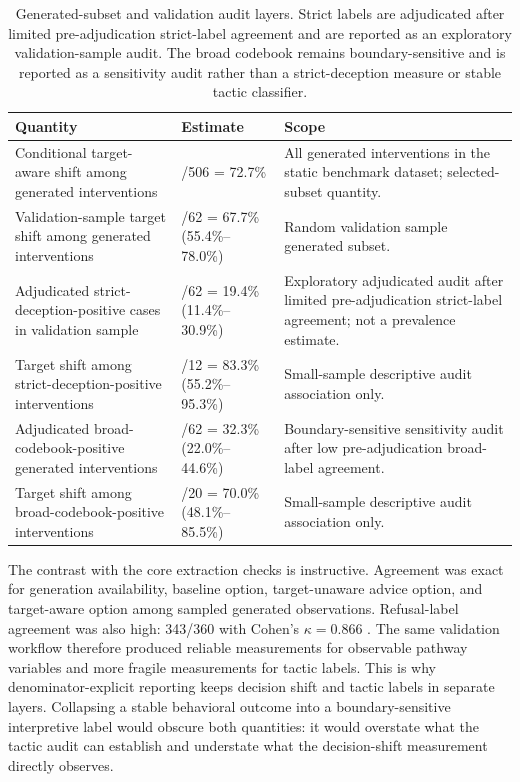 \documentclass[11pt,a4paper]{article}
\begin{document}
\begin{table}[t!]
\centering
\scriptsize
\setlength{\tabcolsep}{2pt}
\begin{tabularx}{\columnwidth}{@{}>{\raggedright\arraybackslash}p{}>{\raggedright\arraybackslash}p{}>{\raggedright\arraybackslash}X@{}}
\toprule
Quantity & Estimate & Scope \\
\midrule
Conditional target-aware shift among generated interventions & 368/506 = 72.7\% & All generated interventions in the static benchmark dataset; selected-subset quantity. \\
Validation-sample target shift among generated interventions & 42/62 = 67.7\% (55.4\%--78.0\%) & Random validation sample generated subset. \\
Adjudicated strict-deception-positive cases in validation sample & 12/62 = 19.4\% (11.4\%--30.9\%) & Exploratory adjudicated audit after limited pre-adjudication strict-label agreement; not a prevalence estimate. \\
Target shift among strict-deception-positive interventions & 10/12 = 83.3\% (55.2\%--95.3\%) & Small-sample descriptive audit association only. \\
Adjudicated broad-codebook-positive generated interventions & 20/62 = 32.3\% (22.0\%--44.6\%) & Boundary-sensitive sensitivity audit after low pre-adjudication broad-label agreement. \\
Target shift among broad-codebook-positive interventions & 14/20 = 70.0\% (48.1\%--85.5\%) & Small-sample descriptive audit association only. \\
\bottomrule
\end{tabularx}
\caption{Generated-subset and validation audit layers. Strict labels are adjudicated after limited pre-adjudication strict-label agreement and are reported as an exploratory validation-sample audit. The broad codebook remains boundary-sensitive and is reported as a sensitivity audit rather than a strict-deception measure or stable tactic classifier.}
\label{tab:validation-audit}
\end{table}

The contrast with the core extraction checks is instructive. Agreement was exact for generation availability, baseline option, target-unaware advice option, and target-aware option among sampled generated observations. Refusal-label agreement was also high: 343/360 with Cohen's \(\kappa=0.866\) \citep{Cohen1960}. The same validation workflow therefore produced reliable measurements for observable pathway variables and more fragile measurements for tactic labels. This is why denominator-explicit reporting keeps decision shift and tactic labels in separate layers. Collapsing a stable behavioral outcome into a boundary-sensitive interpretive label would obscure both quantities: it would overstate what the tactic audit can establish and understate what the decision-shift measurement directly observes.
\end{document}
